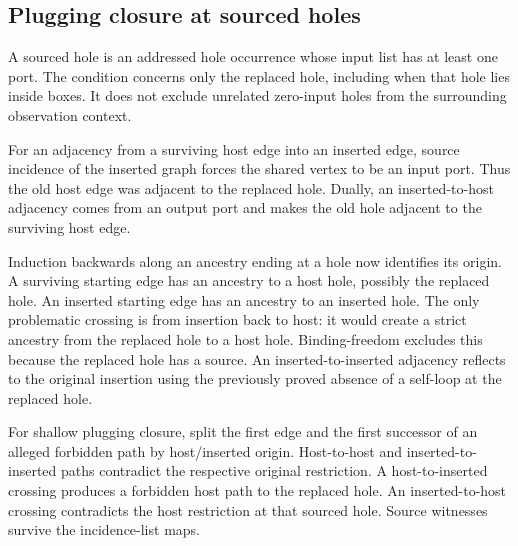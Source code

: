 











\subsection{Plugging closure at sourced holes}
A sourced hole is an addressed hole occurrence whose input list has at
least one port. The condition concerns only the replaced hole, including
when that hole lies inside boxes. It does not exclude unrelated zero-input
holes from the surrounding observation context.


For an adjacency from a surviving host edge into an inserted edge,
source incidence of the inserted graph forces the shared vertex to be an
input port. Thus the old host edge was adjacent to the replaced hole.
Dually, an inserted-to-host adjacency comes from an output port and makes
the old hole adjacent to the surviving host edge.

Induction backwards along an ancestry ending at a hole now identifies its
origin. A surviving starting edge has an ancestry to a host hole, possibly
the replaced hole. An inserted starting edge has an ancestry to an inserted
hole. The only problematic crossing is from insertion back to host: it
would create a strict ancestry from the replaced hole to a host hole.
Binding-freedom excludes this because the replaced hole has a source.
An inserted-to-inserted adjacency reflects to the original insertion using
the previously proved absence of a self-loop at the replaced hole.

For shallow plugging closure, split the first edge and the first successor
of an alleged forbidden path by host/inserted origin. Host-to-host and
inserted-to-inserted paths contradict the respective original restriction.
A host-to-inserted crossing produces a forbidden host path to the replaced
hole. An inserted-to-host crossing contradicts the host restriction at that
sourced hole. Source witnesses survive the incidence-list maps.

